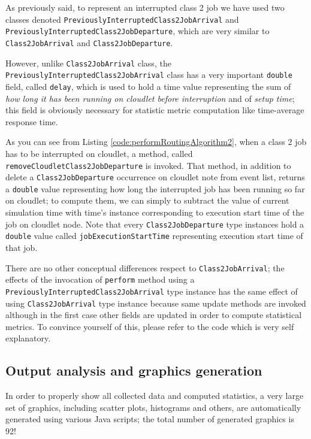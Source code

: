 \documentclass[10pt,a4paper]{article}
\begin{document}
As previously said, to represent an interrupted class 2 job we have used two classes denoted \texttt{PreviouslyInterruptedClass2JobArrival} and \texttt{PreviouslyInterruptedClass2JobDeparture}, which are very similar to \texttt{Class2JobArrival} and  \texttt{Class2JobDeparture}. 

However, unlike \texttt{Class2JobArrival} class, the \texttt{PreviouslyInterruptedClass2JobArrival} class has a very important \texttt{double} field, called \texttt{delay}, which is used to hold a time value representing the sum of \textit{how long it has been running on cloudlet before interruption} and of \textit{setup time}; this field is obviously necessary for statistic metric computation like time-average response time.

As you can see from Listing \ref{code:performRoutingAlgorithm2}, when a class 2 job has to be interrupted on cloudlet, a method, called \texttt{removeCloudletClass2JobDeparture} is invoked. That method, in addition to delete a \texttt{Class2JobDeparture} occurrence on cloudlet note from event list, returns a \texttt{double} value representing how long the interrupted job has been running so far on cloudlet; to compute them, we can simply to subtract the value of current simulation time with time's instance corresponding to execution start time of the job on cloudlet node. Note that every \texttt{Class2JobDeparture} type instances hold a \texttt{double} value called \texttt{jobExecutionStartTime} representing execution start time of that job.

There are no other conceptual differences respect to \texttt{Class2JobArrival}; the effects of the invocation of \texttt{perform} method using a \texttt{PreviouslyInterruptedClass2JobArrival} type instance has the same effect of using \texttt{Class2JobArrival} type instance because same update methods are invoked although in the first case other fields are updated in order to compute statistical metrics. To convince yourself of this, please refer to the code which is very self explanatory. 

\subsection{Output analysis and graphics generation}

In order to properly show all collected data and computed statistics, a very large set of graphics, including scatter plots, histograms and others, are automatically generated using various Java scripts; the total number of generated graphics is 92! 
\end{document}
